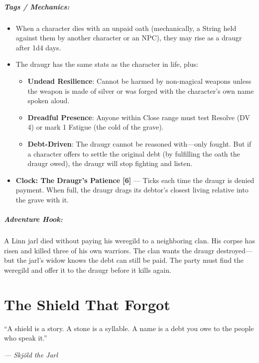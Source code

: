\documentclass[9pt,a5paper]{extbook}
\begin{document}
\paragraph{Tags / Mechanics:}
\begin{itemize}
    \item When a character dies with an unpaid oath (mechanically, a String held against them by another character or an NPC), they may rise as a draugr after 1d4 days.
    \item The draugr has the same stats as the character in life, plus:
    \begin{itemize}
        \item \textbf{Undead Resilience}: Cannot be harmed by non-magical weapons unless the weapon is made of silver or was forged with the character's own name spoken aloud.
        \item \textbf{Dreadful Presence}: Anyone within Close range must test Resolve (DV 4) or mark 1 Fatigue (the cold of the grave).
        \item \textbf{Debt-Driven}: The draugr cannot be reasoned with---only fought. But if a character offers to settle the original debt (by fulfilling the oath the draugr owed), the draugr will stop fighting and listen.
    \end{itemize}
    \item \textbf{Clock: The Draugr's Patience [6]} --- Ticks each time the draugr is denied payment. When full, the draugr drags its debtor's closest living relative into the grave with it.
\end{itemize}

\paragraph{Adventure Hook:}
A Linn jarl died without paying his weregild to a neighboring clan. His corpse has risen and killed three of his own warriors. The clan wants the draugr destroyed---but the jarl's widow knows the debt can still be paid. The party must find the weregild and offer it to the draugr before it kills again.

\clearpage

\chapter{The Shield That Forgot}

\epigraph{``A shield is a story. A stone is a syllable. A name is a debt you owe to the people who speak it.''}{\textit{--- Skjöld the Jarl}}
\end{document}
